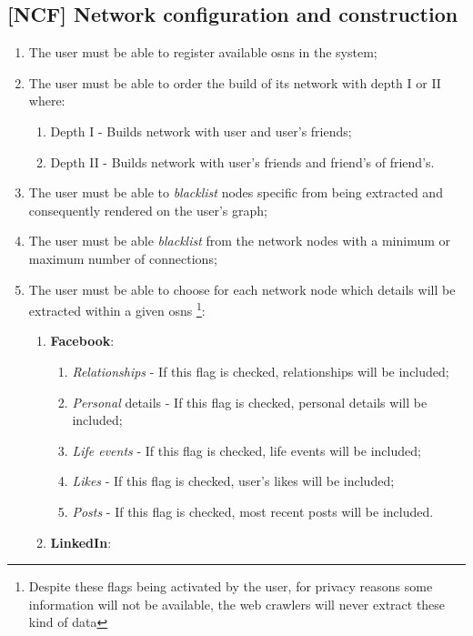 \subsection*{\textbf{[NCF] Network configuration and construction}}
\begin{enumerate}
    \item The user must be able to register available \glspl{osn} in the system;
    \item The user must be able to order the build of its network with depth I or II where:
    \begin{enumerate}
        \item Depth I - Builds network with user and user's friends;
        \item Depth II - Builds network with user's friends and friend's of friend's.
    \end{enumerate}
    \item The user must be able to \textit{blacklist} nodes specific from being extracted and consequently rendered on the user's graph;
    \item The user must be able \textit{blacklist} from the network nodes with a minimum or maximum number of connections;
    \item The user must be able to choose for each network node which details will be extracted within a given \glspl{osn} \footnote{Despite these flags being activated by the user, for privacy reasons some information will not be available, the web crawlers will never extract these kind of data}:
    \begin{enumerate}
        \item \textbf{Facebook}:
        \begin{enumerate}
            \item \textit{Relationships} - If this flag is checked, relationships will be included;
            \item \textit{Personal} details - If this flag is checked, personal details will be included;
            \item \textit{Life events} - If this flag is checked, life events will be included;
            \item \textit{Likes} - If this flag is checked, user's likes will be included;
            \item \textit{Posts} - If this flag is checked, most recent posts will be included.
        \end{enumerate}
        \item \textbf{LinkedIn}:

\end{enumerate}
\end{enumerate}
